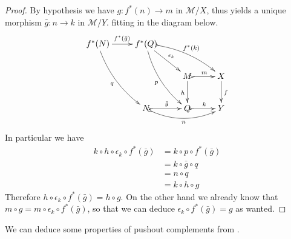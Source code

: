 \documentclass[a4paper]{article}
\theoremstyle{definition}
\begin{document}
\begin{proof}
By hypothesis we have $g\colon f^*(n)\to m$ in $\mathcal{M}/X$, thus  yields a unique morphism $\bar{g}\colon n\to k$ in $\mathcal{M}/Y$. fitting in the diagram below.
 \[\xymatrix{f^*(N) \ar@/_.3cm/[ddr]_{q} \ar[r]^{f^*(\bar{g})}& f^*(Q) \ar[dr]^{\epsilon_k} \ar@{>->}@/^.3cm/[drr]^{f^*(k)} \ar@/_.3cm/[ddr]_{p}\\&& M \ar@{>->}[r]^{m}\ar[d]_{h}& X \ar[d]^f \\&N \ar@{>->}[r]^{\bar{g}} \ar@{>->}@/_.4cm/[rr]_{n} &Q\ar@{>->}[r]^{k}&Y}\]
In particular we have
\begin{align*}k\circ h\circ \epsilon_k\circ f^*(\bar{g})&=k\circ p\circ f^*(\bar{g})\\&=k\circ \bar{g}\circ q\\&=n\circ q\\&=k\circ h\circ g
\end{align*}
Therefore $ h\circ \epsilon_k\circ f^*(\bar{g})=h\circ g$. On the other hand we already know that $m\circ g=m\circ \epsilon_k\circ f^*(\bar{g})$, so that we can deduce $\epsilon_k \circ f^*(\bar{g})=g$ as wanted.
\end{proof}

We can deduce some properties of pushout complements from .
\end{document}
